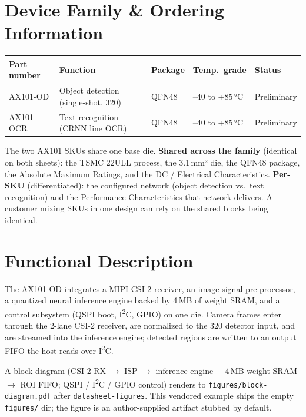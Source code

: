 \documentclass{anvil-datasheet}
\begin{document}
\section{Device Family \& Ordering Information}

\begin{specbox}
\begin{tabularx}{\textwidth}{@{} l X l l l @{}}
\toprule
\textbf{Part number} & \textbf{Function} & \textbf{Package} & \textbf{Temp.\ grade} & \textbf{Status} \\
\midrule
AX101-OD & Object detection (single-shot, 320\texttimes320) & QFN48 & --40 to +85\,°C & Preliminary \\
AX101-OCR & Text recognition (CRNN line OCR) & QFN48 & --40 to +85\,°C & Preliminary \\
\bottomrule
\end{tabularx}
\end{specbox}

The two AX101 SKUs share one base die. \textbf{Shared across the family}
(identical on both sheets): the TSMC 22ULL process, the 3.1\,mm² die, the QFN48
package, the Absolute Maximum Ratings, and the DC / Electrical Characteristics.
\textbf{Per-SKU} (differentiated): the configured network (object detection vs.\
text recognition) and the Performance Characteristics that network delivers. A
customer mixing SKUs in one design can rely on the shared blocks being identical.

\section{Functional Description}

The AX101-OD integrates a MIPI CSI-2 receiver, an image signal pre-processor, a
quantized neural inference engine backed by 4\,MB of weight SRAM, and a control
subsystem (QSPI boot, I\textsuperscript{2}C, GPIO) on one die. Camera frames
enter through the 2-lane CSI-2 receiver, are normalized to the 320
detector input, and are streamed into the inference engine; detected regions are
written to an output FIFO the host reads over I\textsuperscript{2}C.

\begin{callout}[title=Block diagram]
A block diagram (CSI-2 RX $\rightarrow$ ISP $\rightarrow$ inference engine + 4\,MB
weight SRAM $\rightarrow$ ROI FIFO; QSPI / I\textsuperscript{2}C / GPIO control)
renders to \texttt{figures/block-diagram.pdf} after \texttt{datasheet-figures}.
This vendored example ships the empty \texttt{figures/} dir; the figure is an
author-supplied artifact stubbed by default.
\end{callout}
\end{document}
